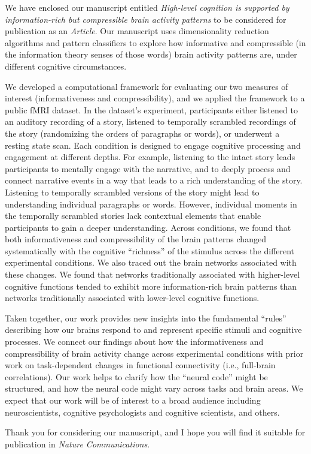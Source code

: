 \documentclass[10pt,stdletter,orderfromtodate,sigleft]{newlfm}
\newcommand{\journal}{Nature Communications}
\newcommand{\articletype}{Article}
\newcommand{\myTitle}{High-level cognition is supported by information-rich but compressible brain activity patterns}
\begin{document}
\begin{newlfm}

  We have enclosed our manuscript entitled \textit{\myTitle} to be considered
  for publication as an \textit{\articletype}. Our manuscript uses
  dimensionality reduction algorithms and pattern classifiers to explore how
  informative and compressible (in the information theory senses of those
  words) brain activity patterns are, under different cognitive circumstances.

  We developed a computational framework for evaluating our two measures of
  interest (informativeness and compressibility), and we applied the framework
  to a public fMRI dataset. In the dataset's experiment, participants either
  listened to an auditory recording of a story, listened to temporally
  scrambled recordings of the story (randomizing the orders of paragraphs or
  words), or underwent a resting state scan. Each condition is designed to
  engage cognitive processing and engagement at different depths. For example,
  listening to the intact story leads participants to mentally engage with the
  narrative, and to deeply process and connect narrative events in a way that
  leads to a rich understanding of the story. Listening to temporally scrambled
  versions of the story might lead to understanding individual paragraphs or
  words. However, individual moments in the temporally scrambled stories lack
  contextual elements that enable participants to gain a deeper understanding.
  Across conditions, we found that both informativeness and compressibility of
  the brain patterns changed systematically with the cognitive ``richness'' of
  the stimulus across the different experimental conditions. We also traced out
  the brain networks associated with these changes. We found that networks
  traditionally associated with higher-level cognitive functions tended to
  exhibit more information-rich brain patterns than networks traditionally
  associated with lower-level cognitive functions.

  Taken together, our work provides new insights into the fundamental ``rules''
  describing how our brains respond to and represent specific stimuli and
  cognitive processes. We connect our findings about how the informativeness
  and compressibility of brain activity change across experimental conditions
  with prior work on task-dependent changes in functional connectivity (i.e.,
  full-brain correlations). Our work helps to clarify how the ``neural code''
  might be structured, and how the neural code might vary across tasks and
  brain areas. We expect that our work will be of interest to a broad audience
  including neuroscientists, cognitive psychologists and cognitive scientists,
  and others.


Thank you for considering our manuscript, and I hope you will find it suitable
for publication in \textit{\journal}.


\end{newlfm}
\end{document}
